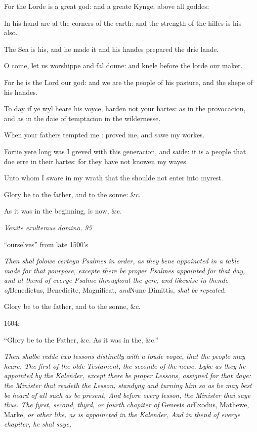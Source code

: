 For the Lorde is a great god: and a greate Kynge, above
all goddes: 

In his hand are al the corners of the earth: and the
strength of the hilles is his also.

The Sea is his, and he made it and his handes prepared
the drie lande.

O come, let us worshippe and fal doune: and knele before
the lorde our maker.

For he is the Lord our god: and we are the people of
his pasture, and the shepe of his handes.

To day if ye wyl heare his voyce, harden not your hartes:
as in the provocacion, and as in the daie of temptacion in the wildernesse.

When your fathers tempted me : proved me, and sawe
my workes.

Fortie yere long was I greved with this generacion,
and saide: it is a people that doe erre in their hartes: for they have
not knowen my wayes.

Unto whom I sware in my wrath that the shoulde not
enter into my\emph{}rest.

Glory be to the father, and to the sonne: \&c.

As it was in the beginning, is now, \&c.

\emph{Venite
exultemus domino. 95}

``ourselves''
from late 1500's

\emph{Then shal folowe certeyn Psalmes in order, as they bene appoincted in
a table made for that pourpose, excepte there be proper Psalmes appointed
for that day, and at thend of everye Psalme throughout the yere, and likewise
in thende of}Benedictus, Benedicite, Magnificat, \emph{and}Nunc Dimittis,
\emph{shal be repeated.}

Glory be to the father, and to the sonne, \&c.

1604:

``Glory be to the
Father, \&c. As it was in the, \&c.''

\emph{Then shalbe redde two lessons distinctly with a loude voyce, that the
people may heare. The first of the olde Testament, the seconde of the
newe, Lyke as they he appointed by the Kalender, except there be proper
Lessons, assigned for that daye: the Minister that readeth the Lesson,
standyng and turning him so as he may best be heard of all such as be
present, And before every lesson, the Minister thai saye thus. The fyrst,
second, thyrd, or fourth chapiter of} Genesis \emph{or}Exodus, Mathewe,
Marke, \emph{or other like, as is appoincted in the Kalender, And in thend
of everye chapiter, he shal saye,}

